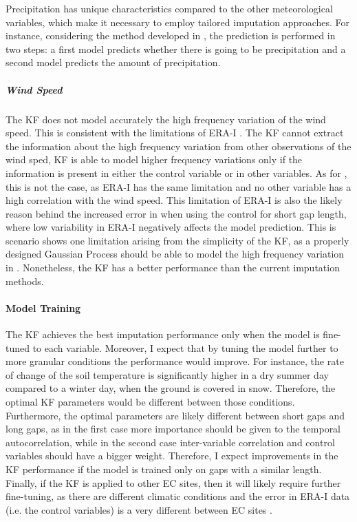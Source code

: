 \documentclass{article}
\begin{document}
Precipitation has unique characteristics compared to the other meteorological variables, which make it necessary to employ tailored imputation approaches. For instance, considering the method developed in \textcite{chivers_imputation_2020}, the prediction is performed in two steps: a first model predicts whether there is going to be precipitation and a second model predicts the amount of precipitation. 

\subparagraph{Wind Speed} The KF does not model accurately the high frequency variation of the wind speed. This is consistent with the limitations of ERA-I \cite{vuichard_filling_2015}. The KF cannot extract the information about the high frequency variation from other observations of the wind sped, KF is able to model higher frequency variations only if the information is present in either the control variable or in other variables. As for , this is not the case, as ERA-I has the same limitation and no other variable has a high correlation with the wind speed. This limitation of ERA-I is also the likely reason behind the increased error in  when using the control for short gap length, where low variability in ERA-I negatively affects the model prediction.
This is scenario shows one limitation arising from the simplicity of the KF, as a properly designed Gaussian Process should be able to model the high frequency variation in . Nonetheless, the KF has a better performance than the current imputation methods. 

\paragraph{Model Training} The KF achieves the best imputation performance only when the model is fine-tuned to each variable. 
Moreover, I expect that by tuning the model further to more granular conditions the performance would improve.
For instance, the rate of change of the soil temperature is significantly  higher in a dry summer day compared to a winter day, when the ground is covered in snow. Therefore, the optimal KF parameters would be different between those conditions.
Furthermore, the optimal parameters are likely different between short gaps and long gaps, as in the first case more importance should be given to the temporal autocorrelation, while in the second case inter-variable correlation and control variables should have a bigger weight. Therefore, I expect improvements in the KF performance if the model is trained only on gaps with a similar length.
Finally, if the KF is applied to other EC sites, then it will likely require further fine-tuning, as there are different climatic conditions and the error in ERA-I data (i.e. the control variables) is a very different between EC sites \cite{vuichard_filling_2015}. 
\end{document}
